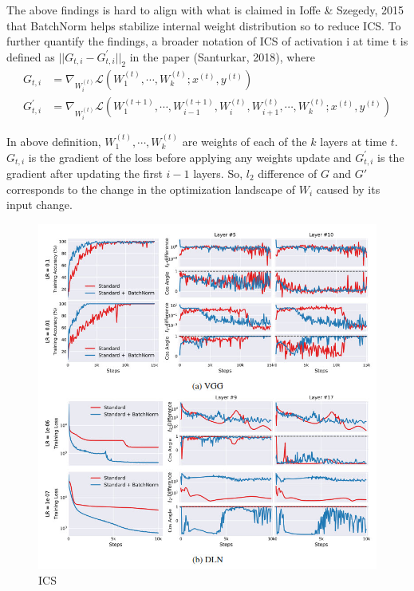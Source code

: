 \documentclass{article}
\begin{document}
The above findings is hard to align with what is claimed in Ioffe \& Szegedy, 2015 that BatchNorm helps stabilize internal weight distribution so to reduce ICS. To further quantify the findings, a broader notation of ICS of activation i at time t is defined as $||G_{t,i}-G^{'}_{t,i}||_2$ in the paper (Santurkar, 2018), where
\begin{align*}
	G_{t,i}&=\nabla_{W_{i}^{(t)}}\mathcal{L}(W_{1}^{(t)},\cdots,W_{k}^{(t)};x^{(t)},y^{(t)})\\
	G^{'}_{t,i}&=\nabla_{W_{i}^{(t)}}\mathcal{L}(W_{1}^{(t+1)},\cdots,
	W_{i-1}^{(t+1)},W_{i}^{(t)},W_{i+1}^{(t)},\cdots,W_{k}^{(t)}
	;x^{(t)},y^{(t)})
\end{align*}

In above definition, $W_{1}^{(t)},\cdots,W_{k}^{(t)}$ are weights of each of the $k$ layers at time $t$. $G_{t,i}$ is the gradient of the loss before applying any weights update and $G^{'}_{t,i}$ is the gradient after updating the first $i-1$ layers. So, $l_2$ difference of $G$ and $G'$ corresponds to the change in the optimization landscape of $W_i$ caused by its input change.

\begin{figure}[!ht]
	\centering
    \includegraphics[width=\textwidth]{pics/batchNorm/Santurkar_fig7.jpg}
	\caption{ICS}
	\label{fig:ICSshift}
\end{figure}
\end{document}
